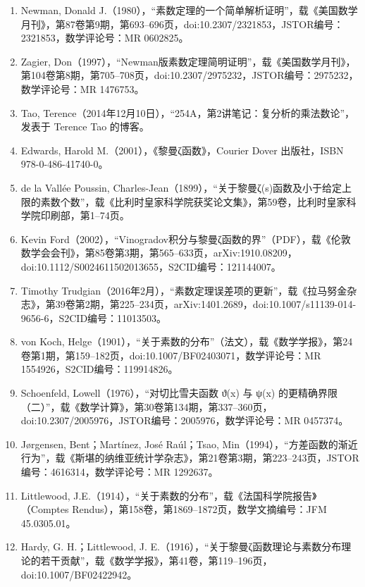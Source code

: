 \begin{enumerate}
\item Newman, Donald J.（1980），“素数定理的一个简单解析证明”，载《美国数学月刊》，第87卷第9期，第693–696页，doi:10.2307/2321853，JSTOR编号：2321853，数学评论号：MR 0602825。
\item Zagier, Don（1997），“Newman版素数定理简明证明”，载《美国数学月刊》，第104卷第8期，第705–708页，doi:10.2307/2975232，JSTOR编号：2975232，数学评论号：MR 1476753。
\item Tao, Terence（2014年12月10日），“254A，第2讲笔记：复分析的乘法数论”，发表于 Terence Tao 的博客。
\item Edwards, Harold M.（2001），《黎曼ζ函数》，Courier Dover 出版社，ISBN 978-0-486-41740-0。
\item de la Vallée Poussin, Charles-Jean（1899），“关于黎曼ζ(s)函数及小于给定上限的素数个数”，载《比利时皇家科学院获奖论文集》，第59卷，比利时皇家科学院印刷部，第1–74页。
\item Kevin Ford（2002），“Vinogradov积分与黎曼ζ函数的界”（PDF），载《伦敦数学会会刊》，第85卷第3期，第565–633页，arXiv:1910.08209，doi:10.1112/S0024611502013655，S2CID编号：121144007。
\item Timothy Trudgian（2016年2月），“素数定理误差项的更新”，载《拉马努金杂志》，第39卷第2期，第225–234页，arXiv:1401.2689，doi:10.1007/s11139-014-9656-6，S2CID编号：11013503。
\item von Koch, Helge（1901），“关于素数的分布”（法文），载《数学学报》，第24卷第1期，第159–182页，doi:10.1007/BF02403071，数学评论号：MR 1554926，S2CID编号：119914826。
\item Schoenfeld, Lowell（1976），“对切比雪夫函数 ϑ(x) 与 ψ(x) 的更精确界限（二）”，载《数学计算》，第30卷第134期，第337–360页，doi:10.2307/2005976，JSTOR编号：2005976，数学评论号：MR 0457374。
\item Jørgensen, Bent；Martínez, José Raúl；Tsao, Min（1994），“方差函数的渐近行为”，载《斯堪的纳维亚统计学杂志》，第21卷第3期，第223–243页，JSTOR编号：4616314，数学评论号：MR 1292637。
\item Littlewood, J.E.（1914），“关于素数的分布”，载《法国科学院报告》（Comptes Rendus），第158卷，第1869–1872页，数学文摘编号：JFM 45.0305.01。
\item Hardy, G. H.；Littlewood, J. E.（1916），“关于黎曼ζ函数理论与素数分布理论的若干贡献”，载《数学学报》，第41卷，第119–196页，doi:10.1007/BF02422942。
\end{enumerate}